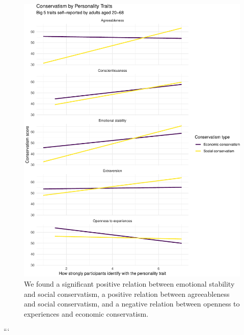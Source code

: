 \documentclass[man]{apa6}
\begin{document}
\begin{figure}
\centering
\includegraphics{manuscript_files/figure-latex/figure2-1.pdf}
\caption{\label{fig:figure2}We found a significant positive relation between emotional stability and social conservatism, a positive relation between agreeableness and social conservatism, and a negative relation between openness to experiences and economic conservatism.}
\end{figure}

```

\endgroup
\end{document}
